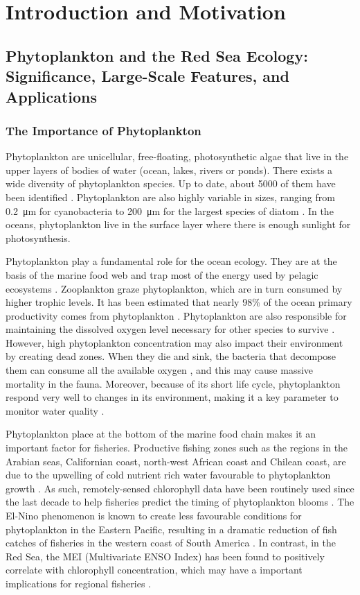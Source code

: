 \chapter{Introduction and Motivation}

\section{Phytoplankton and the Red Sea Ecology: Significance, Large-Scale
Features, and Applications}

\subsection{The Importance of Phytoplankton}

Phytoplankton are unicellular, free-floating, photosynthetic algae that live in
the upper layers of bodies of water (ocean, lakes, rivers or ponds). There
exists a wide diversity of phytoplankton species. Up to date, about 5000 of
them have been identified \citep{Tett1995}. Phytoplankton are also highly
variable in sizes, ranging from \SI{0.2}{\micro\metre} for cyanobacteria to
\SI{200}{\micro\metre} for the largest species of diatom \citep{Pal2014}. In
the oceans, phytoplankton live in the surface layer where there is enough
sunlight for photosynthesis. 

Phytoplankton play a fundamental role for the ocean ecology. They are at the
basis of the marine food web and trap most of the energy used by pelagic
ecosystems \citep{Pal2014}. Zooplankton graze phytoplankton, which are in turn
consumed by higher trophic levels. It has been estimated that nearly 98\% of
the ocean primary productivity comes from phytoplankton \citep{Pal2014}.
Phytoplankton are also responsible for maintaining the dissolved oxygen level
necessary for other species to survive \citep{Pal2014}.  However, high
phytoplankton concentration may also impact their environment by creating dead
zones. When they die and sink, the bacteria that decompose them can consume all
the available oxygen \citep{Pal2014}, and this may cause massive mortality in
the fauna. Moreover, because of its short life cycle, phytoplankton respond
very well to changes in its environment, making it a key parameter to monitor
water quality \citep{Wu2014}.

Phytoplankton place at the bottom of the marine food chain makes it an
important factor for fisheries. Productive fishing zones such as the regions in
the Arabian seas, Californian coast, north-west African coast and Chilean
coast, are due to the upwelling of cold nutrient rich water favourable to
phytoplankton growth \citep{Mann2006}.
As such, remotely-sensed chlorophyll data have been
routinely used since the last decade to help fisheries predict the timing of
phytoplankton blooms \citep{Robinson2010}. The El-Nino phenomenon is known to
create less favourable conditions for phytoplankton in the Eastern Pacific,
resulting in a dramatic reduction of fish catches of fisheries in the western
coast of South America \citep{Robinson2010}. In contrast, in the Red Sea, the
MEI (Multivariate ENSO Index) has been found to positively correlate with
chlorophyll concentration, which may have a important implications for regional
fisheries \citep{Raitsos2015}.

